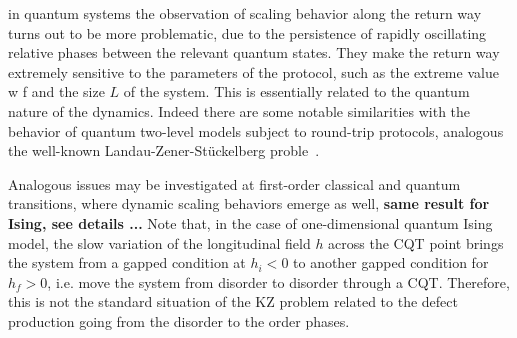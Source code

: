 in quantum systems the observation of 
scaling behavior along the return way turns out to be more
problematic, due to the persistence of rapidly 
oscillating relative phases between the relevant quantum states.
They make the return way extremely sensitive to the 
parameters of the protocol, such as the extreme value w f
and the size $L$ of the system. This is essentially related
to the quantum nature of the dynamics. Indeed there are
some notable similarities with the behavior of quantum
two-level models subject to round-trip protocols, 
analogous the well-known Landau-Zener-Stückelberg proble~\cite{tarantelli2022out}.


Analogous issues may be investigated at first-order
classical and quantum transitions, where dynamic scaling behaviors emerge as well,
{\bf same result for Ising, see details ...}
Note that, in the case of one-dimensional quantum Ising model, the
slow variation of the longitudinal field $h$ across the CQT point
brings the system from a gapped condition at $h_i<0$ to another gapped
condition for $h_f>0$, i.e. move the system from disorder to disorder
through a CQT. Therefore, this is not the standard situation of the KZ
problem related to the defect production going from the disorder to
the order phases.


